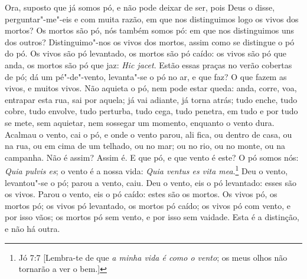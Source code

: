 Ora, suposto que já somos pó, e não pode deixar de ser, pois Deus o
disse, perguntar"-me"-eis e com muita razão, em que nos distinguimos logo
os vivos dos mortos? Os mortos são pó, nós também somos pó: em que nos
distinguimos uns dos outros? Distinguimo"-nos os vivos dos mortos, assim
como se distingue o pó do pó. Os vivos são pó levantado, os mortos são
pó caído: os vivos são pó que anda, os mortos são pó que jaz: \emph{Hic
jacet}. Estão essas praças no verão cobertas de pó; dá um pé"-de"-vento,
levanta"-se o pó no ar, e que faz? O que fazem as vivos, e muitos vivos.
Não aquieta o pó, nem pode estar queda: anda, corre, voa, entrapar esta
rua, sai por aquela; já vai adiante, já torna atrás; tudo enche, tudo
cobre, tudo envolve, tudo perturba, tudo cega, tudo penetra, em tudo e
por tudo se mete, sem aquietar, nem sossegar um momento, enquanto o
vento dura. Acalmau o vento, cai o pó, e onde o vento parou, ali fica,
ou dentro de casa, ou na rua, ou em cima de um telhado, ou no mar; ou no
rio, ou no monte, ou na campanha. Não é assim? Assim é. E que pó, e que
vento é este? O pó somos nós:
\emph{Quia pulvis es}; o vento é a nossa vida: \emph{Quia ventus es vita
mea}.\footnote{Jó 7:7 [Lembra-te de que \emph{a minha vida é como o vento}; os meus olhos não tornarão a ver o bem.]} Deu o vento, levantou"-se o pó; parou a vento, caiu. Deu o
vento, eis o pó levantado: esses são os vivos. Parou o vento, eis o pó
caído: estes são os mortos. Os vivos pó, os mortos pó; os vivos pó
levantado, os mortos pó caído; os vivos pó com vento, e por isso vãos;
os mortos pó sem vento, e por isso sem vaidade. Esta é a distinção, e
não há outra.

